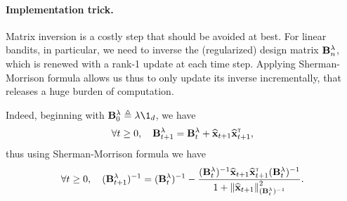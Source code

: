 

%

\paragraph{Implementation trick.}
Matrix inversion is a costly step that should be avoided at best. For linear bandits, in particular, we need to inverse the (regularized) design matrix ${\bf B}^{\lambda}_n$, which is renewed with a rank-1 update at each time step. Applying Sherman-Morrison formula allows us thus to only update its inverse incrementally, that releases a huge burden of computation.

Indeed, beginning with $\bB^{\lambda}_0 \eqdef \lambda\1_d$, we have
\[
    \forall t\geq 0, \quad {\bf B}^{\lambda}_{t+1} = {\bf B}^{\lambda}_t + \widehat{{\bf x}}_{t+1}\widehat{{\bf x}}_{t+1}^\mathsf{\scriptscriptstyle T},
\]
thus using Sherman-Morrison formula we have
\[
    \forall t\geq 0, \quad ({\bf B}^{\lambda}_{t+1})^{-1} = ({\bf B}^{\lambda}_t)^{-1} - \frac{({\bf B}^{\lambda}_t)^{-1}\widehat{{\bf x}}_{t+1}\widehat{{\bf x}}_{t+1}^\mathsf{\scriptscriptstyle T}({\bf B}^{\lambda}_t)^{-1}}{1+\left\lVert\widehat{{\bf x}}_{t+1}\right\rVert_{({\bf B}^{\lambda}_t)^{-1}}^2}.
\]

